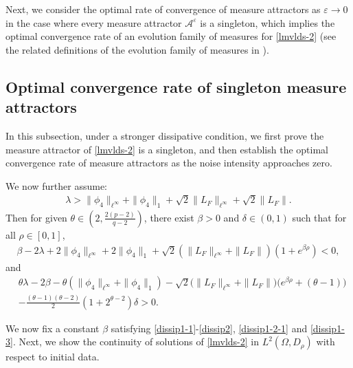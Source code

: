 \documentclass[11pt]{article}
\numberwithin{equation}{section}
\theoremstyle{plain}
\begin{document}
  
  
  Next,
  we consider the 
   optimal rate of convergence
   of measure attractors
   as $\varepsilon \to 0$
   in the  case where 
   every measure attractor
   $ \mathcal{A}^\varepsilon$
   is a singleton, which   implies the optimal convergence rate of an evolution family of measures for \eqref{lmvlds-2}
   (see the related definitions of the evolution family of measures in \cite{DR2007, LL2025CMP}).
 

\subsection{Optimal convergence rate of singleton measure attractors}
In this subsection,
under a stronger dissipative
condition, 
 we first prove 
 the measure attractor 
 of \eqref{lmvlds-2} is a singleton,
 and then establish the   optimal convergence rate of 
 measure  attractors
 as  the  noise intensity
 approaches zero. 
 
 We  now further assume:
 \begin{align}\label{dissip1-2}
	\lambda
	 > \|\phi_{4}\|_{\ell^\infty} + \|\phi_{4}\|_1
	    + \sqrt{2}\|L_{F}\|_{\ell^\infty}
	    + \sqrt{2}\|L_{F}\|.
 \end{align}
  Then for given $\theta \in \left(2, \tfrac{2(p-2)}{q-2} \right)$, 
  there exist $\beta > 0$ and $\delta \in (0, 1)$ such that
  for all $\rho \in [0,1]$,
   \begin{align}\label{dissip1-2-1}
                \beta - 2\lambda + 2\|\phi_{4}\|_{\ell^\infty} + 2\|\phi_{4}\|_1
   	                     + \sqrt{2}( \|L_{F}\|_{\ell^\infty} + \|L_{F}\| )
   	                         (1+e^{\beta \rho} )
   	                    < 0,
  \end{align}
  and 
  \begin{align}\label{dissip1-3}
 	   & \theta \lambda 
 	                       - 2 \beta 
 	                       - \theta \left( \|\phi_4\|_{\ell^\infty} +  \|\phi_4\|_1 \right) 
 	                       - \sqrt{2}
 	                                   \big( \|L_{F}\|_{\ell^\infty} + \|L_{F}\| \big) 
 	                                   \big( e^{\beta \rho} + (\theta - 1) \big)  \nonumber\\
 	    & - \frac{(\theta - 1)(\theta - 2)}{2} (1 + 2^{\theta-2}) \delta
 	     > 0.
  \end{align}
 
 We now fix a constant $\beta$ satisfying \eqref{dissip1-1}-\eqref{dissip2}, \eqref{dissip1-2-1} and \eqref{dissip1-3}.
  Next, we show the continuity of solutions of \eqref{lmvlds-2} in $L^2(\Omega, D_\rho)$ with respect to initial data.
\end{document}

